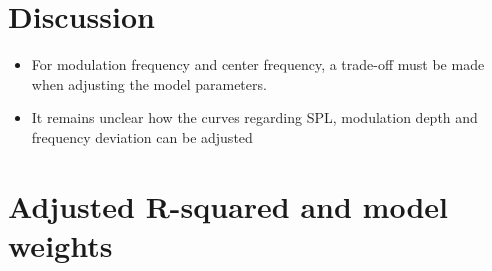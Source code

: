 \documentclass{article}
\begin{document}
\section{Discussion}
\label{sec:discussion}

\begin{itemize}
  \item For modulation frequency and center frequency, a trade-off must be made
  when adjusting the model parameters.
  \item It remains unclear how the curves regarding SPL, modulation depth and
  frequency deviation can be adjusted
\end{itemize}

\mybibliography{}

\clearpage

\appendix

\section{Adjusted R-squared and model weights}

\end{document}
